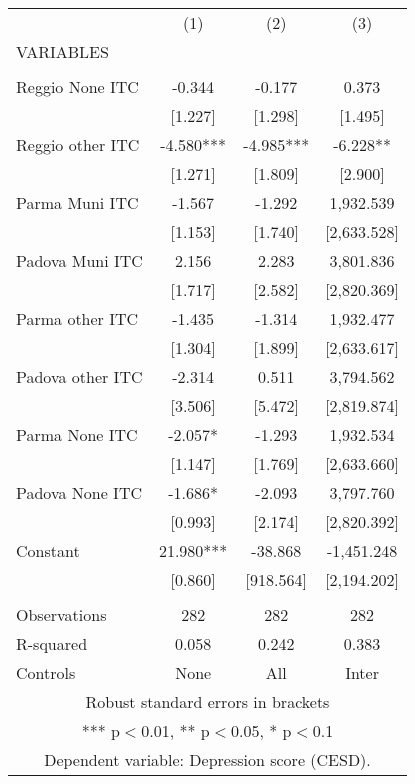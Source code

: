 \begin{tabular}{lccc} \hline
 & (1) & (2) & (3) \\
VARIABLES &  &  &  \\ \hline
 &  &  &  \\
Reggio None ITC & -0.344 & -0.177 & 0.373 \\
 & [1.227] & [1.298] & [1.495] \\
Reggio other ITC & -4.580*** & -4.985*** & -6.228** \\
 & [1.271] & [1.809] & [2.900] \\
Parma Muni ITC & -1.567 & -1.292 & 1,932.539 \\
 & [1.153] & [1.740] & [2,633.528] \\
Padova Muni ITC & 2.156 & 2.283 & 3,801.836 \\
 & [1.717] & [2.582] & [2,820.369] \\
Parma other ITC & -1.435 & -1.314 & 1,932.477 \\
 & [1.304] & [1.899] & [2,633.617] \\
Padova other ITC & -2.314 & 0.511 & 3,794.562 \\
 & [3.506] & [5.472] & [2,819.874] \\
Parma None ITC & -2.057* & -1.293 & 1,932.534 \\
 & [1.147] & [1.769] & [2,633.660] \\
Padova None ITC & -1.686* & -2.093 & 3,797.760 \\
 & [0.993] & [2.174] & [2,820.392] \\
Constant & 21.980*** & -38.868 & -1,451.248 \\
 & [0.860] & [918.564] & [2,194.202] \\
 &  &  &  \\
Observations & 282 & 282 & 282 \\
R-squared & 0.058 & 0.242 & 0.383 \\
 Controls & None & All & Inter \\ \hline
\multicolumn{4}{c}{ Robust standard errors in brackets} \\
\multicolumn{4}{c}{ *** p$<$0.01, ** p$<$0.05, * p$<$0.1} \\
\multicolumn{4}{c}{ Dependent variable: Depression score (CESD).} \\
\end{tabular}
